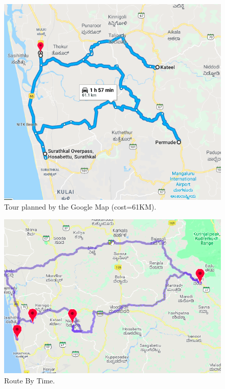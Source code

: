 \documentclass[conference]{IEEEtran}
\begin{document}
\begin{figure}[htbp]
\centerline{\includegraphics[width=\columnwidth]{tspResultGoogle.png}}
\caption{Tour planned by the Google Map (cost=61KM).}
\label{fig4}
\end{figure}


\begin{figure}[htbp]
\centerline{\includegraphics[width=\columnwidth]{distance.png}}
\caption{Route By Time.}
\label{fig5}
\end{figure}
\end{document}
